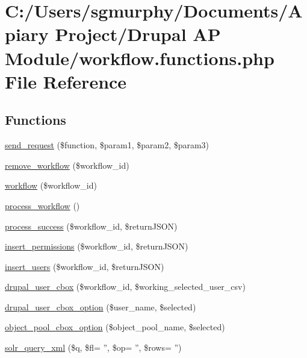 \hypertarget{workflow_8functions_8php}{
\section{C:/Users/sgmurphy/Documents/Apiary Project/Drupal AP Module/workflow.functions.php File Reference}
\label{workflow_8functions_8php}
}
\subsection*{Functions}
\begin{DoxyCompactItemize}
\item 
\hyperlink{workflow_8functions_8php_a78bd2c85ad1dcdc1fb68e40605d593b0}{send\_\-request} (\$function, \$param1, \$param2, \$param3)
\item 
\hyperlink{workflow_8functions_8php_a8ad99e8c7e97c535f83e28e21d78676c}{remove\_\-workflow} (\$workflow\_\-id)
\item 
\hyperlink{workflow_8functions_8php_ae14d5e0ee58a96811fec24ddef6804ef}{workflow} (\$workflow\_\-id)
\item 
\hyperlink{workflow_8functions_8php_a35a6c169715d6e28cd5117dd8d167094}{process\_\-workflow} ()
\item 
\hyperlink{workflow_8functions_8php_a412560f9041557abc8fd2b5b9f7ac4d8}{process\_\-success} (\$workflow\_\-id, \$returnJSON)
\item 
\hyperlink{workflow_8functions_8php_ada0693a0ae920b6a95d5f5b84f153e84}{insert\_\-permissions} (\$workflow\_\-id, \$returnJSON)
\item 
\hyperlink{workflow_8functions_8php_a9a63e6239c01d9c01fc82f38324afd21}{insert\_\-users} (\$workflow\_\-id, \$returnJSON)
\item 
\hyperlink{workflow_8functions_8php_a4189b45f7deb8243fe7a17d35f004ab3}{drupal\_\-user\_\-cbox} (\$workflow\_\-id, \$working\_\-selected\_\-user\_\-csv)
\item 
\hyperlink{workflow_8functions_8php_a7a5d2f34ccc636dbac03a4f428efacad}{drupal\_\-user\_\-cbox\_\-option} (\$user\_\-name, \$selected)
\item 
\hyperlink{workflow_8functions_8php_a9506fdd370aef346d27fcea8b4bfb54d}{object\_\-pool\_\-cbox\_\-option} (\$object\_\-pool\_\-name, \$selected)
\item 
\hyperlink{workflow_8functions_8php_ae6356bbdc7e39f2f56be2e74848e4c58}{solr\_\-query\_\-xml} (\$q, \$fl= '', \$op= '', \$rows= '')
\end{DoxyCompactItemize}
